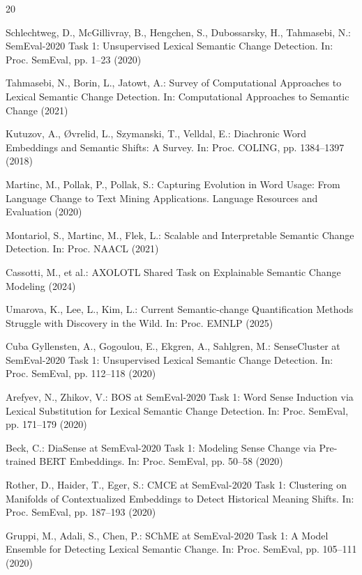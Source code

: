 \documentclass{llncs}
\begin{document}
\begin{thebibliography}{20}

Schlechtweg, D., McGillivray, B., Hengchen, S., Dubossarsky, H., Tahmasebi, N.: SemEval-2020 Task 1: Unsupervised Lexical Semantic Change Detection. In: Proc. SemEval, pp. 1--23 (2020)

Tahmasebi, N., Borin, L., Jatowt, A.: Survey of Computational Approaches to Lexical Semantic Change Detection. In: Computational Approaches to Semantic Change (2021)

Kutuzov, A., {\O}vrelid, L., Szymanski, T., Velldal, E.: Diachronic Word Embeddings and Semantic Shifts: A Survey. In: Proc. COLING, pp. 1384--1397 (2018)

Martinc, M., Pollak, P., Pollak, S.: Capturing Evolution in Word Usage: From Language Change to Text Mining Applications. Language Resources and Evaluation (2020)

Montariol, S., Martinc, M., Flek, L.: Scalable and Interpretable Semantic Change Detection. In: Proc. NAACL (2021)

Cassotti, M., et al.: AXOLOTL Shared Task on Explainable Semantic Change Modeling (2024)

Umarova, K., Lee, L., Kim, L.: Current Semantic-change Quantification Methods Struggle with Discovery in the Wild. In: Proc. EMNLP (2025)

Cuba Gyllensten, A., Gogoulou, E., Ekgren, A., Sahlgren, M.: SenseCluster at SemEval-2020 Task 1: Unsupervised Lexical Semantic Change Detection. In: Proc. SemEval, pp. 112--118 (2020)

Arefyev, N., Zhikov, V.: BOS at SemEval-2020 Task 1: Word Sense Induction via Lexical Substitution for Lexical Semantic Change Detection. In: Proc. SemEval, pp. 171--179 (2020)

Beck, C.: DiaSense at SemEval-2020 Task 1: Modeling Sense Change via Pre-trained BERT Embeddings. In: Proc. SemEval, pp. 50--58 (2020)

Rother, D., Haider, T., Eger, S.: CMCE at SemEval-2020 Task 1: Clustering on Manifolds of Contextualized Embeddings to Detect Historical Meaning Shifts. In: Proc. SemEval, pp. 187--193 (2020)

Gruppi, M., Adali, S., Chen, P.: SChME at SemEval-2020 Task 1: A Model Ensemble for Detecting Lexical Semantic Change. In: Proc. SemEval, pp. 105--111 (2020)


\end{thebibliography}
\end{document}
